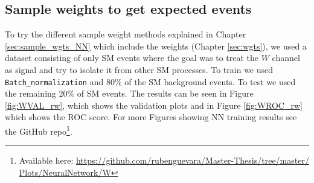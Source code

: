 \documentclass[12pt, a4paper]{book}
\begin{document}
\subsection{Sample weights to get expected events}\label{sec:samp_wgts_NN_res}
To try the different sample weight methods explained in Chapter \ref{sec:sample_wgts_NN} which include the weights (Chapter \ref{sec:wgts}), we used a dataset consisting of only SM events where the goal was to treat the $W$ channel as signal and try to isolate it from other SM processes. To train we used \verb|Batch_normalization| and 80\% of the SM background events. 
To test we used the remaining 20\% of SM events. The results can be seen in Figure \ref{fig:WVAL_rw}, which shows the validation plots and in Figure \ref{fig:WROC_rw} which shows the ROC score. For more Figures showing NN training results see the GitHub repo\footnote{Available here: \href{https://github.com/rubenguevara/Master-Thesis/tree/master/Plots/NeuralNetwork/W}{https://github.com/rubenguevara/Master-Thesis/tree/master/\\Plots/NeuralNetwork/W}}. 
\end{document}
